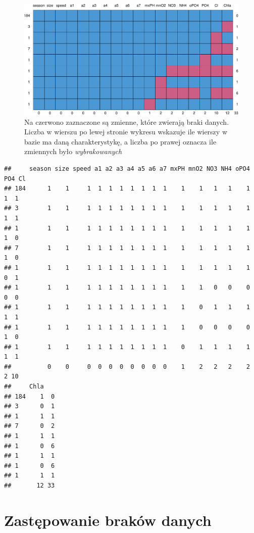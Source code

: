 \documentclass[]{book}
\theoremstyle{plain}
\theoremstyle{definition}
\theoremstyle{definition}
\theoremstyle{definition}
\theoremstyle{definition}
\theoremstyle{remark}
\begin{document}
\begin{figure}
\centering
\includegraphics{EksploracjaDanych_files/figure-latex/mice1-1.pdf}
\caption{\label{fig:mice1}Na czerwono zaznaczone są zmienne, które zwierają braki danych. Liczba w wierszu po lewej stronie wykresu wskazuje ile wierszy w bazie ma daną charakterystykę, a liczba po prawej oznacza ile zmiennych było \emph{wybrakowanych}}
\end{figure}

\begin{verbatim}
##     season size speed a1 a2 a3 a4 a5 a6 a7 mxPH mnO2 NO3 NH4 oPO4 PO4 Cl
## 184      1    1     1  1  1  1  1  1  1  1    1    1   1   1    1   1  1
## 3        1    1     1  1  1  1  1  1  1  1    1    1   1   1    1   1  1
## 1        1    1     1  1  1  1  1  1  1  1    1    1   1   1    1   1  0
## 7        1    1     1  1  1  1  1  1  1  1    1    1   1   1    1   1  0
## 1        1    1     1  1  1  1  1  1  1  1    1    1   1   1    1   0  1
## 1        1    1     1  1  1  1  1  1  1  1    1    1   0   0    0   0  0
## 1        1    1     1  1  1  1  1  1  1  1    1    0   1   1    1   1  1
## 1        1    1     1  1  1  1  1  1  1  1    1    0   0   0    0   1  0
## 1        1    1     1  1  1  1  1  1  1  1    0    1   1   1    1   1  1
##          0    0     0  0  0  0  0  0  0  0    1    2   2   2    2   2 10
##     Chla   
## 184    1  0
## 3      0  1
## 1      1  1
## 7      0  2
## 1      1  1
## 1      0  6
## 1      1  1
## 1      0  6
## 1      1  1
##       12 33
\end{verbatim}

\hypertarget{zastepowanie-brakow-danych}{%
\section{Zastępowanie braków danych}\label{zastepowanie-brakow-danych}}
\end{document}
